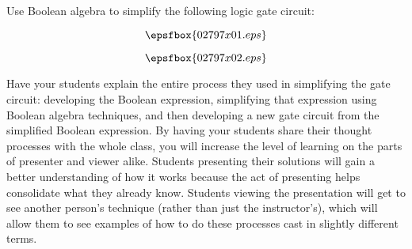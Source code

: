 

Use Boolean algebra to simplify the following logic gate circuit:

$$\epsfbox{02797x01.eps}$$







$$\epsfbox{02797x02.eps}$$







Have your students explain the entire process they used in simplifying the gate circuit: developing the Boolean expression, simplifying that expression using Boolean algebra techniques, and then developing a new gate circuit from the simplified Boolean expression.  By having your students share their thought processes with the whole class, you will increase the level of learning on the parts of presenter and viewer alike.  Students presenting their solutions will gain a better understanding of how it works because the act of presenting helps consolidate what they already know.  Students viewing the presentation will get to see another person's technique (rather than just the instructor's), which will allow them to see examples of how to do these processes cast in slightly different terms.




